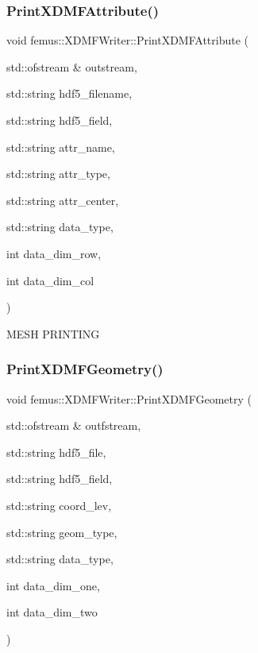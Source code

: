 \subsubsection{\texorpdfstring{Print\+X\+D\+M\+F\+Attribute()}{PrintXDMFAttribute()}}
{\footnotesize\ttfamily void femus\+::\+X\+D\+M\+F\+Writer\+::\+Print\+X\+D\+M\+F\+Attribute (\begin{DoxyParamCaption}\item[{std\+::ofstream \&}]{outstream,  }\item[{std\+::string}]{hdf5\+\_\+filename,  }\item[{std\+::string}]{hdf5\+\_\+field,  }\item[{std\+::string}]{attr\+\_\+name,  }\item[{std\+::string}]{attr\+\_\+type,  }\item[{std\+::string}]{attr\+\_\+center,  }\item[{std\+::string}]{data\+\_\+type,  }\item[{int}]{data\+\_\+dim\+\_\+row,  }\item[{int}]{data\+\_\+dim\+\_\+col }\end{DoxyParamCaption})\hspace{0.3cm}{\ttfamily [static]}}

M\+E\+SH P\+R\+I\+N\+T\+I\+NG \mbox{\label{classfemus_1_1_x_d_m_f_writer_a539ef898a591187533c67bdb9cf3c397}} 
\subsubsection{\texorpdfstring{Print\+X\+D\+M\+F\+Geometry()}{PrintXDMFGeometry()}}
{\footnotesize\ttfamily void femus\+::\+X\+D\+M\+F\+Writer\+::\+Print\+X\+D\+M\+F\+Geometry (\begin{DoxyParamCaption}\item[{std\+::ofstream \&}]{outfstream,  }\item[{std\+::string}]{hdf5\+\_\+file,  }\item[{std\+::string}]{hdf5\+\_\+field,  }\item[{std\+::string}]{coord\+\_\+lev,  }\item[{std\+::string}]{geom\+\_\+type,  }\item[{std\+::string}]{data\+\_\+type,  }\item[{int}]{data\+\_\+dim\+\_\+one,  }\item[{int}]{data\+\_\+dim\+\_\+two }\end{DoxyParamCaption})\hspace{0.3cm}{\ttfamily [static]}}

